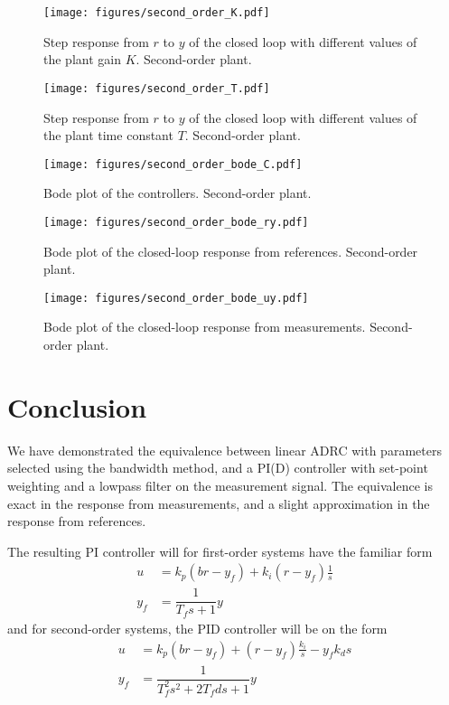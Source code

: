 \documentclass[letterpaper, 10 pt, conference]{ieeeconf}
\begin{document}
\begin{figure}[h]
	\centering
	\texttt{[image: figures/second\_order\_K.pdf]}
	\caption{Step response from $r$ to $y$ of the closed loop with different values of the plant gain $K$. Second-order plant.}
	\label{fig:second_order_K}
\end{figure}
\begin{figure}[h]
	\centering
	\texttt{[image: figures/second\_order\_T.pdf]}
	\caption{Step response from $r$ to $y$ of the closed loop with different values of the plant time constant $T$. Second-order plant.}
	\label{fig:second_order_T}
\end{figure}
\begin{figure}[h]
	\centering
	\texttt{[image: figures/second\_order\_bode\_C.pdf]}
	\caption{Bode plot of the controllers. Second-order plant.}
	\label{fig:second_order_bode_C}
\end{figure}
\begin{figure}[h]
	\centering
	\texttt{[image: figures/second\_order\_bode\_ry.pdf]}
	\caption{Bode plot of the closed-loop response from references. Second-order plant.}
	\label{fig:second_order_bode_ry}
\end{figure}
\begin{figure}[h]
	\centering
	\texttt{[image: figures/second\_order\_bode\_uy.pdf]}
	\caption{Bode plot of the closed-loop response from measurements. Second-order plant.}
	\label{fig:second_order_bode_uy}
\end{figure}

\section{Conclusion}
We have demonstrated the equivalence between linear ADRC with parameters selected using the bandwidth method, and a PI(D) controller with set-point weighting and a lowpass filter on the measurement signal. The equivalence is exact in the response from measurements, and a slight approximation in the response from references. 

The resulting PI controller will for first-order systems have the familiar form
\begin{align}
u &= k_p (br - y_f) + k_i(r-y_f)\frac{1}{s} \\
y_f &= \dfrac{1}{T_f s + 1} y
\end{align}
and for second-order systems, the PID controller will be on the form
\begin{align}
u &= k_p (br - y_f) + (r-y_f)\frac{k_i}{s} - y_fk_d s \\
y_f &= \dfrac{1}{T_f^2s^2 + 2T_f d s + 1} y
\end{align}
\end{document}
